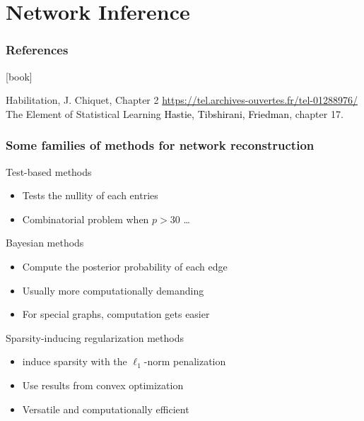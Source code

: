 \section{Network Inference}


\begin{frame}
  \frametitle{References}

    \begin{thebibliography}{99}
      [book]

     Habilitation, J. Chiquet, Chapter 2 \href{https://tel.archives-ouvertes.fr/tel-01288976/}{https://tel.archives-ouvertes.fr/tel-01288976/}
     The Element of Statistical Learning \textcolor{black}{Hastie, Tibshirani, Friedman}, chapter 17.
    \end{thebibliography}

\end{frame}

\begin{frame}
  \frametitle{Some families of methods for network reconstruction}

  \begin{block}{Test-based methods}
    \vspace{-.15cm}
    \begin{itemize}
    \item Tests the nullity of each entries 
    \item Combinatorial problem when $p>30$ \dots
    \end{itemize}    
  \end{block}
  
  \vfill

  \begin{block}{Bayesian methods}
    \vspace{-.15cm}
    \begin{itemize}
    \item Compute the posterior probability of each edge
    \item Usually more computationally demanding
    \item For special graphs, computation gets easier
    \end{itemize}
  \end{block}

  \begin{block}{\alert{Sparsity-inducing regularization methods}}
    \vspace{-.15cm}
    \begin{itemize}
    \item induce sparsity with the $\ell_1$-norm penalization
    \item Use results from convex optimization
    \item Versatile and computationally efficient
    \end{itemize}
  \end{block}

\end{frame}

